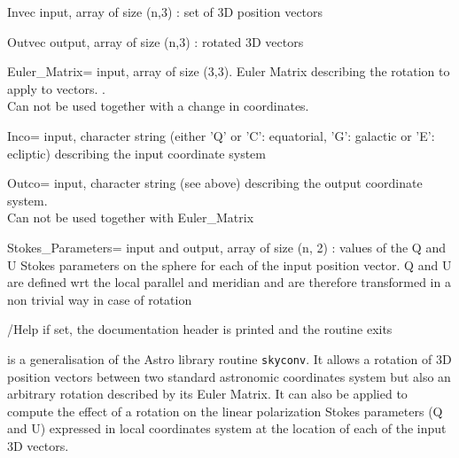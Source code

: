 \begin{qualifiers}
  \begin{qulist}{} %
    \item[Invec] 
      input,  array of size (n,3) : set of 3D position vectors
    \item[Outvec] 
     output, array of size (n,3) : rotated 3D vectors
    \item[Euler\_Matrix=] 
       input, array of size (3,3). Euler Matrix
       describing the rotation to apply to vectors.
       .\\
       Can not be used together with a change in coordinates.
    \item[Inco=] 
       input, character string (either 'Q' or 'C': equatorial,
    'G': galactic or 'E': ecliptic) describing the input coordinate system 
    \item[Outco=] 
        input, character string (see above) describing the output
          coordinate system.\\
    Can not be used together with Euler\_Matrix
    \item[Stokes\_Parameters=]
       input and output, array of size (n, 2) :
      values of the Q and U Stokes parameters on the sphere for each of
      the input position vector. Q and U are defined wrt the local
      parallel and meridian and are therefore transformed in a non
      trivial way in case of rotation
  \end{qulist}
\end{qualifiers}

\begin{keywords}
  \begin{kwlist}{} %
    \item[/Help] 
     if set, the documentation header is printed and the routine exits	
  \end{kwlist}
\end{keywords}  

\begin{codedescription}
{\thedocid{} is a generalisation of the Astro library routine {\tt skyconv}. It allows
a rotation of 3D position vectors between two standard astronomic coordinates
system but also an arbitrary rotation described by its Euler Matrix.
It can also be applied to compute the effect of a rotation on the
linear polarization Stokes parameters (Q and U) expressed in local
coordinates system at the location of each of the input 3D vectors.}
\end{codedescription}



